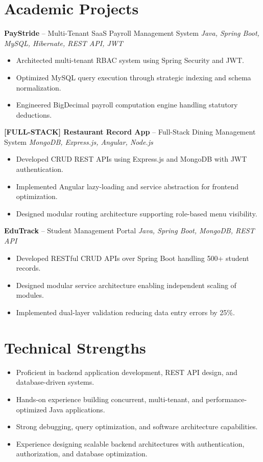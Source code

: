 \documentclass[10.5pt,a4paper]{article}
\begin{document}
\section{Academic Projects}
\textbf{PayStride} -- Multi-Tenant SaaS Payroll Management System \hfill \textit{Java, Spring Boot, MySQL, Hibernate, REST API, JWT}
\begin{itemize}
  \item Architected multi-tenant RBAC system using Spring Security and JWT.
  \item Optimized MySQL query execution through strategic indexing and schema normalization.
  \item Engineered BigDecimal payroll computation engine handling statutory deductions.
\end{itemize}
\vspace{4pt}
\textbf{[FULL-STACK] Restaurant Record App} -- Full-Stack Dining Management System \hfill \textit{MongoDB, Express.js, Angular, Node.js}
\begin{itemize}
  \item Developed CRUD REST APIs using Express.js and MongoDB with JWT authentication.
  \item Implemented Angular lazy-loading and service abstraction for frontend optimization.
  \item Designed modular routing architecture supporting role-based menu visibility.
\end{itemize}
\vspace{4pt}
\textbf{EduTrack} -- Student Management Portal \hfill \textit{Java, Spring Boot, MongoDB, REST API}
\begin{itemize}
  \item Developed RESTful CRUD APIs over Spring Boot handling 500+ student records.
  \item Designed modular service architecture enabling independent scaling of modules.
  \item Implemented dual-layer validation reducing data entry errors by 25\%.
\end{itemize}
\section{Technical Strengths}
\begin{itemize}
  \item Proficient in backend application development, REST API design, and database-driven systems.
  \item Hands-on experience building concurrent, multi-tenant, and performance-optimized Java applications.
  \item Strong debugging, query optimization, and software architecture capabilities.
  \item Experience designing scalable backend architectures with authentication, authorization, and database optimization.
\end{itemize}
\end{document}
